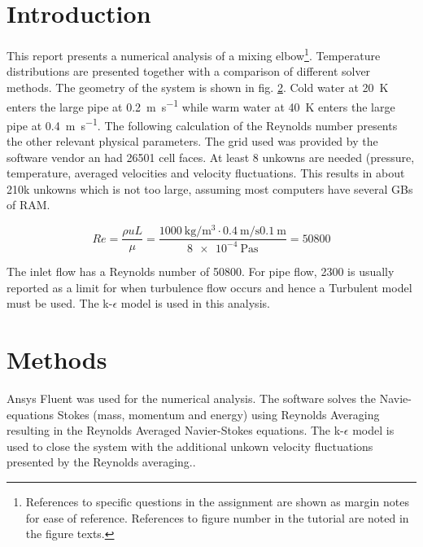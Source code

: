 \documentclass{article}
\begin{document}

\section{Introduction}
This report presents a numerical analysis of a mixing elbow\footnote{References to specific questions in the assignment are shown as margin notes for ease of reference. References to figure number in the tutorial are noted in the figure texts.}. Temperature distributions are presented together with a comparison of different solver methods. The geometry of the system is shown in fig. \ref{}. Cold water at \SI{20}{\kelvin} enters the large pipe at \SI{0.2}{\meter\per\second} while warm water at \SI{40}{\kelvin} enters the large pipe at \SI{0.4}{\meter\per\second}. The following calculation of the Reynolds number presents the other relevant physical parameters. The grid used was provided by the software vendor an had 26501 cell faces. At least 8 unkowns are needed (pressure, temperature, averaged velocities and velocity fluctuations. This results in about 210k unkowns which is not too large, assuming most computers have several GBs of RAM.

\begin{equation}
Re = \frac{\rho u L}{\mu} = \frac{\SI{1000}{\kilogram\per\meter^3}\cdot\SI{0.4}{\meter\per\second}\SI{0.1}{\meter}}{\SI{8e-4}{\pascal\second}} = 50800
\end{equation}

The inlet flow has a Reynolds number of 50800. For pipe flow, 2300 is usually reported as a limit for when turbulence flow occurs and hence a Turbulent model must be used. The k-$\epsilon$ model is used in this analysis.

\section{Methods}
Ansys Fluent was used for the numerical analysis. The software solves the Navie-equations Stokes (mass, momentum and energy) using Reynolds Averaging resulting in the Reynolds Averaged Navier-Stokes equations. The k-$\epsilon$ model is used to close the system with the additional unkown velocity fluctuations presented by the Reynolds averaging..
\end{document}
